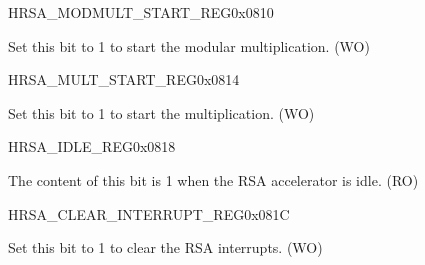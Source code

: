 \begin{register}{H}{RSA\_MODMULT\_START\_REG}{0x{}0810}\label{regdesc:RSAMODMULTSTARTREG}
%
%
\regnewline%
\begin{regdesc}\begin{reglist}
\item [RSA\_MODMULT\_START] Set this bit to 1 to start the modular multiplication. (WO)
\end{reglist}\end{regdesc}
\end{register}


\begin{register}{H}{RSA\_MULT\_START\_REG}{0x{}0814}\label{regdesc:RSAMULTSTARTREG}
%
%
\regnewline%
\begin{regdesc}\begin{reglist}
\item [RSA\_MULT\_START] Set this bit to 1 to start the multiplication. (WO)
\end{reglist}\end{regdesc}
\end{register}



\begin{register}{H}{RSA\_IDLE\_REG}{0x{}0818}\label{regdesc:RSAIDLEREG}
%
%
\regnewline%
\begin{regdesc}\begin{reglist}
\item [RSA\_IDLE] The content of this bit is 1 when the RSA accelerator is idle. (RO)
\end{reglist}\end{regdesc}
\end{register}


\begin{register}{H}{RSA\_CLEAR\_INTERRUPT\_REG}{0x{}081C}\label{regdesc:RSACLEARINTERRUPTREG}
%
%
\regnewline%
\begin{regdesc}\begin{reglist}
\item [RSA\_CLEAR\_INTERRUPT] Set this bit to 1 to clear the RSA interrupts. (WO)
\end{reglist}\end{regdesc}
\end{register}


